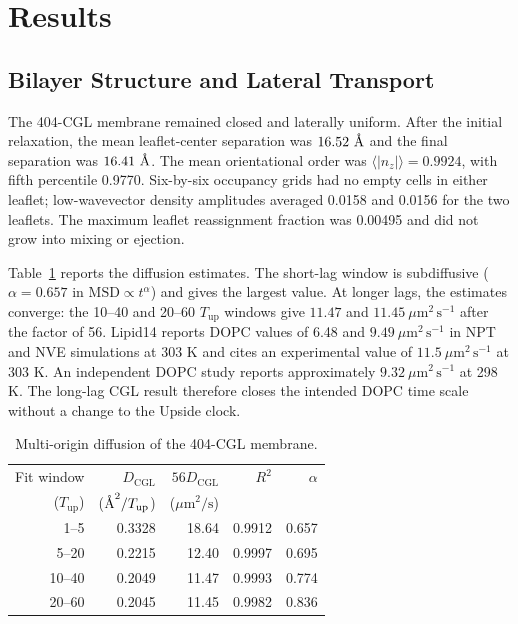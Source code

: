 \documentclass{article}
\newcommand{\angstrom}{\text{\normalfont\AA}}
\begin{document}
\section{Results}

\subsection{Bilayer Structure and Lateral Transport}

The 404-CGL membrane remained closed and laterally uniform.  After the initial
relaxation, the mean leaflet-center separation was $16.52~\angstrom$ and the
final separation was $16.41~\angstrom$.  The mean orientational order was
$\langle|n_z|\rangle=0.9924$, with fifth percentile 0.9770.  Six-by-six
occupancy grids had no empty cells in either leaflet; low-wavevector density
amplitudes averaged 0.0158 and 0.0156 for the two leaflets.  The maximum
leaflet reassignment fraction was 0.00495 and did not grow into mixing or
ejection.

Table~\ref{tab:diffusion} reports the diffusion estimates.  The short-lag
window is subdiffusive ($\alpha=0.657$ in
$\mathrm{MSD}\propto t^{\alpha}$) and gives the largest value.  At longer
lags, the estimates converge: the 10--40 and 20--60 $T_{\mathrm{up}}$ windows
give $11.47$ and $11.45~\mu\mathrm{m}^2\,\mathrm{s}^{-1}$ after the factor of
56.  Lipid14 reports DOPC values of 6.48 and
$9.49~\mu\mathrm{m}^2\,\mathrm{s}^{-1}$ in NPT and NVE simulations at 303 K
and cites an experimental value of $11.5~\mu\mathrm{m}^2\,\mathrm{s}^{-1}$ at
303 K.\cite{dickson2014}  An independent DOPC study reports approximately
$9.32~\mu\mathrm{m}^2\,\mathrm{s}^{-1}$ at 298 K.\cite{ermilova2020}  The
long-lag CGL result therefore closes the intended DOPC time scale without a
change to the Upside clock.

\begin{table}[ht]
\centering
\caption{Multi-origin diffusion of the 404-CGL membrane.}
\begin{tabular}{rrrrr}
\toprule
Fit window & $D_{\mathrm{CGL}}$ & $56D_{\mathrm{CGL}}$ & $R^2$ & $\alpha$ \\
($T_{\mathrm{up}}$) & ($\angstrom^2/T_{\mathrm{up}}$) & ($\mu\mathrm{m}^2/\mathrm{s}$) & & \\
\midrule
1--5   & 0.3328 & 18.64 & 0.9912 & 0.657 \\
5--20  & 0.2215 & 12.40 & 0.9997 & 0.695 \\
10--40 & 0.2049 & 11.47 & 0.9993 & 0.774 \\
20--60 & 0.2045 & 11.45 & 0.9982 & 0.836 \\
\bottomrule
\end{tabular}
\label{tab:diffusion}
\end{table}
\end{document}
